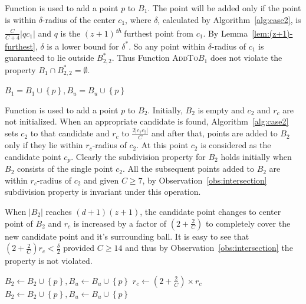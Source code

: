 \documentclass[envcountsame]{cls/cccg15}
\newcommand{\nth}{\textsuperscript{\textit{th}} }
\newcommand{\set}[1]{\left\{ #1 \right\}}
\newcommand{\card}[1]{\left|{#1}\right|}
\newcommand{\gee}{\geqslant}
\renewcommand{\ge}{\gee}
\begin{document}
Function  is used to add a point $p$ to $B_1$. The point will be added only if the point is within $\delta$\nobreakdash-radius of the center $c_1$, where $\delta$, calculated by Algorithm~\ref{alg:case2}, is $\frac{C}{C+4}\card{qc_1}$ and $q$ is the $(z+1)$\nth furthest point from $c_1$. By Lemma~\ref{lem:(z+1)-furthest}, $\delta$ is a lower bound for $\delta^*$. So any point within $\delta$-radius of $c_1$ is guaranteed to lie outside $B_{2,2}^*$. Thus Function \textsc{AddTo$B_1$} does not violate the property $B_1 \cap B_{2,2}^* = \emptyset$.
\begin{algorithmic}
		\State $B_1 = B_1 \cup \set{p}, B_u = B_u \cup \set{p}$
		\State {}
	\EndIf
	\State {}
\EndFunction
\end{algorithmic}

Function  is used to add a point $p$ to $B_2$. Initially, $B_2$ is empty and $c_2$ and $r_c$ are not initialized. When an appropriate candidate is found, Algorithm~\ref{alg:case2} sets $c_2$ to that candidate and $r_c$ to $\frac{2\card{c_1c_2}}{C}$ and after that, points are added to $B_2$ only if they lie within $r_c$-radius of $c_2$. At this point $c_2$ is considered as the candidate point $c_p$. Clearly the subdivision property for $B_2$ holds initially when $B_2$ consists of the single point $c_2$. All the subsequent points added to $B_2$ are within $r_c$-radius of $c_2$ and given $C\ge 7$, by Observation~\ref{obs:intersection} subdivision property is invariant under this operation.

When $\card{B_2}$ reaches $(d+1)(z+1)$, the candidate point changes to center point of $B_2$ and $r_c$ is increased by a factor of $(2 + \frac{2}{C})$ to completely cover the new candidate point and it's surrounding ball. It is easy to see that $(2 + \frac{2}{C})r_c < \frac{\delta}{2}$ provided $C \ge 14$ and thus by Observation~\ref{obs:intersection} the property is not violated.

\begin{algorithmic}
		\State $B_2 \gets B_2 \cup \set{p}, B_u \gets B_u \cup \set{p}$
		\If{$\card{B_2} = (d+1)(z+1)$}
			\State $r_c \gets  (2 + \frac{2}{C}) \times r_c$
					\State $B_2 \gets B_2 \cup \set{p}, B_u \gets B_u \cup \set{p}$
				\EndIf
			\EndFor
		\EndIf
		\State {}
	\EndIf
	\State {}
\EndFunction
\end{algorithmic}
\end{document}
